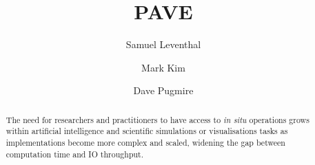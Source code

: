 \documentclass[sigconf,authordraft]{acmart}%
\begin{document}
\title{PAVE}

\author{Samuel Leventhal}
\authornotemark[1]
\author{Mark Kim}

\author{Dave Pugmire}


\renewcommand{\shortauthors}{Leventhal and Kim, et al.}

\begin{abstract}
 The need for researchers and practitioners to have access to {\it in situ} operations grows within artificial intelligence and scientific simulations or visualisations tasks as implementations become more complex and scaled, widening the gap between computation time and IO throughput. 
\end{abstract}

\end{document}
